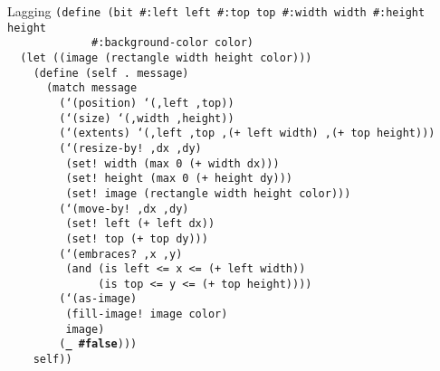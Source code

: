 \begin{frame}{Lagging}
  \tiny
  \texttt{(define (bit \#:left left \#:top top \#:width width \#:height height\\
    \ \ \ \ \ \ \ \ \ \ \ \ \ \#:background-color color)\\
    \ \ (let ((image (rectangle width height color)))\\
    \ \ \ \ (define (self .\ message)\\
    \ \ \ \ \ \ (match message\\
    \ \ \ \ \ \ \ \ (`(position) `(,left ,top))\\
    \ \ \ \ \ \ \ \ (`(size) `(,width ,height))\\
    \ \ \ \ \ \ \ \ (`(extents) `(,left ,top ,(+ left width) ,(+ top height)))\\
    \ \ \ \ \ \ \ \ (`(resize-by!\ ,dx ,dy)\\
    \ \ \ \ \ \ \ \ \ (set!\ width (max 0 (+ width dx)))\\
    \ \ \ \ \ \ \ \ \ (set!\ height (max 0 (+ height dy)))\\
    \ \ \ \ \ \ \ \ \ (set!\ image (rectangle width height color)))\\
    \ \ \ \ \ \ \ \ (`(move-by!\ ,dx ,dy)\\
    \ \ \ \ \ \ \ \ \ (set!\ left (+ left dx))\\
    \ \ \ \ \ \ \ \ \ (set!\ top (+ top dy)))\\
    \ \ \ \ \ \ \ \ (`(embraces?\ ,x ,y)\\
    \ \ \ \ \ \ \ \ \ (and (is left <= x <= (+ left width))\\
    \ \ \ \ \ \ \ \ \ \ \ \ \ \ (is top <= y <= (+ top height))))\\
    \ \ \ \ \ \ \ \ (`(as-image)\\
    \ \ \ \ \ \ \ \ \ (fill-image!\ image color)\\
    \ \ \ \ \ \ \ \ \ image)\\
    \ \ \ \ \ \ \ \ (\textbf{\_ \#false})))\\
    \ \ \ \ self))
  }
\end{frame}

